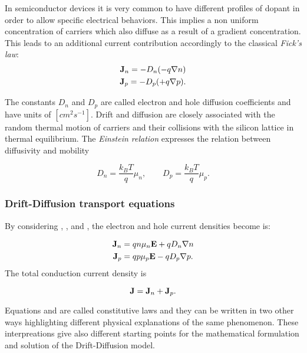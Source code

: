 In semiconductor devices it is very common to have different profiles of dopant in order to allow specific electrical behaviors. This implies a non uniform concentration of carriers which also diffuse as a result of a gradient concentration. This leads to an additional current contribution accordingly to the classical \textit{Fick's law}:
\begin{align}
\mathbf{J}_n = -D_n(-q\nabla n) \label{eq: diff electron}\\
\mathbf{J}_p = -D_p(+q\nabla p) . \label{eq: diff hole}
\end{align}

The constants $D_n$ and $D_p$ are called electron and hole diffusion coefficients and have units of $[cm^2s^{-1}]$. Drift and diffusion are closely associated with the random thermal motion of carriers and their collisions with the silicon lattice in thermal equilibrium. The \textit{Einstein relation}  expresses the relation between diffusivity and mobility

\begin{equation}
\label{eq: einstein relation}
D_n = \dfrac{k_BT}{q}\mu_n, \qquad D_p = \dfrac{k_BT}{q}\mu_p.
\end{equation}

\subsubsection{Drift-Diffusion transport equations}
\label{subsub:driftdiffusion transport}

By considering , ,  and , the electron and hole current densities become \cite{selberherr:SimSem} is:

\begin{align}
\mathbf{J}_n &= qn\mu_n\mathbf{E} + qD_n\nabla n  \label{eq: drift diff electron}\\ 
\mathbf{J}_p &= qp\mu_p\mathbf{E} - qD_p \nabla p. \label{eq: drift diff hole}
\end{align}
The total conduction current density is

\begin{equation*}
\mathbf{J}=\mathbf{J}_n+\mathbf{J}_p.
\end{equation*}


Equations  and  are called constitutive laws and they can be written in two other ways highlighting different physical explanations of the same phenomenon. These interpreations give also different starting points for the mathematical formulation and solution of the Drift-Diffusion model.

